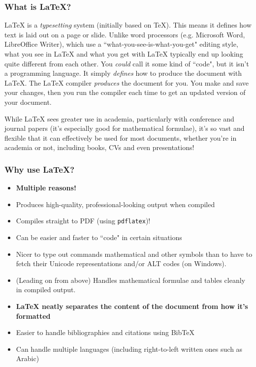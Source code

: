 \documentclass{beamer}
\newcommand{\biggap}{\newline{}\newline{}}
\begin{document}
	\begin{frame}
		\frametitle{What is \LaTeX{?}}
		\LaTeX{} is a \textit{typesetting} system (initially based on \TeX{}). \pause This means it defines how text is laid out on a page or slide. \pause Unlike word processors (e.g. Microsoft Word, LibreOffice Writer), which use a ``what-you-see-is-what-you-get" editing style, what you see in \LaTeX{} and what you get with \LaTeX{} typically end up looking quite different from each other. \pause You \textit{could} call it some kind of ``code", but it isn't a programming language. \pause It simply \textit{defines} how to produce the document with \LaTeX. \pause The \LaTeX{} compiler \textit{produces} the document for you. You make and save your changes, then you run the compiler each time to get an updated version of your document.\pause\biggap
		
		While \LaTeX{} sees greater use in academia, particularly with conference and journal papers (it's especially good for mathematical formulae), it's so vast and flexible that it can effectively be used for most documents, whether you're in academia or not, including books, CVs and even presentations!
	\end{frame}
	
	\begin{frame}[fragile]
		\frametitle{Why use \LaTeX{?}}
		\begin{itemize}
			\item<1-> \textbf{Multiple reasons!}
			\item<2-> Produces high-quality, professional-looking output when compiled
			\item<3-> Compiles straight to PDF (using \verb|pdflatex|)!
			\item<4-> Can be easier and faster to ``code" in certain situations
			\item<5-> Nicer to type out commands mathematical and other symbols than to have to fetch their Unicode representations and/or ALT codes (on Windows).
			\item<6-> (Leading on from above) Handles mathematical formulae and tables cleanly in compiled output.
			\item<7-> \textbf{\LaTeX{} neatly separates the content of the document from how it's formatted}
			\item<8-> Easier to handle bibliographies and citations using Bib\TeX{}
			\item<9-> Can handle multiple languages (including right-to-left written ones such as Arabic)
		\end{itemize}
	\end{frame}
	
\end{document}
